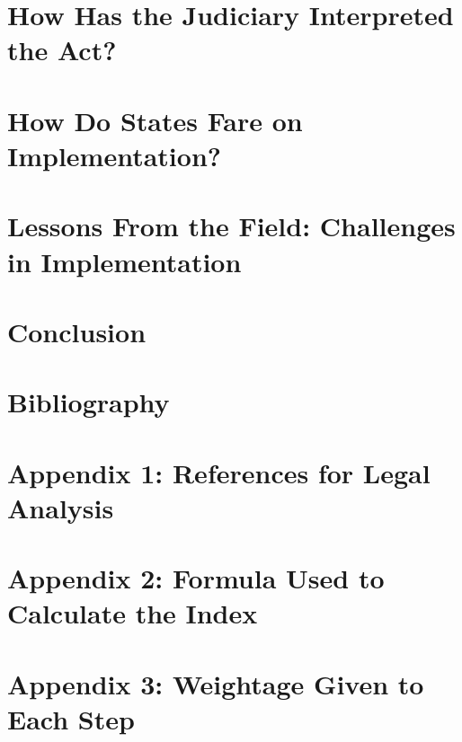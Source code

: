 \documentclass[a4paper, 12pt, twoside]{article}
\begin{document}
\section{How Has the Judiciary Interpreted the Act?}

\section{How Do States Fare on Implementation?}

\section{Lessons From the Field: Challenges in Implementation}

\section*{Conclusion}

\section*{Bibliography}
\printbibliography[heading=none] 

\newpage      
\section*{Appendix 1: References for Legal Analysis}

\section*{Appendix 2: Formula Used to Calculate the Index}

\section*{Appendix 3: Weightage Given to Each Step}
\end{document}
